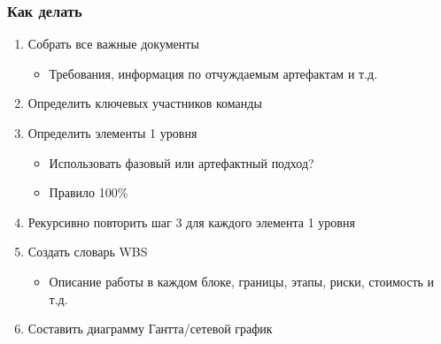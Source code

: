 \documentclass{../../slides-style}
\begin{document}
    \begin{frame}
        \frametitle{Как делать}
        \begin{enumerate}
            \item Собрать все важные документы
            \begin{itemize}
                \item Требования, информация по отчуждаемым артефактам и т.д.
            \end{itemize}
            \item Определить ключевых участников команды
            \item Определить элементы 1 уровня
            \begin{itemize}
                \item Использовать фазовый или артефактный подход?
                \item Правило 100\%
            \end{itemize}
            \item Рекурсивно повторить шаг 3 для каждого элемента 1 уровня
            \item Создать словарь WBS
            \begin{itemize}
                \item Описание работы в каждом блоке, границы, этапы, риски, стоимость и т.д.
            \end{itemize}
            \item Составить диаграмму Гантта/сетевой график
        \end{enumerate}
    \end{frame}
\end{document}
